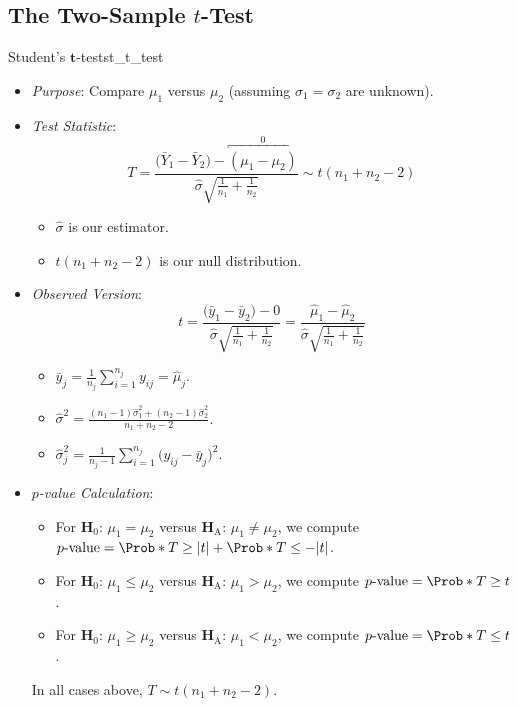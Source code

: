 \subsection{The Two-Sample \texorpdfstring{$ t $}{t}-Test}
\begin{Statistical_Test}{Student's $ \symbf{t} $-test}{st_t_test}
    \begin{itemize}
        \item \emph{Purpose}: Compare $ \mu_1 $ versus $ \mu_2 $ (assuming $ \sigma_1=\sigma_2 $ are unknown).
        \item \emph{Test Statistic}:
              \[ T=\frac{\bigl(\bar{Y}_1-\bar{Y}_2\bigr)-\overbracket{(\mu_1-\mu_2)}^0}{\displaystyle \hat{\sigma}\sqrt{\frac{1}{n_1}+\frac{1}{n_2}}}\sim t(n_1+n_2-2) \]
              \begin{itemize}
                  \item $ \hat{\sigma} $ is our estimator.
                  \item $ t(n_1+n_2-2) $ is our null distribution.
              \end{itemize}
        \item \emph{Observed Version}:
              \[ t=\frac{\bigl(\bar{y}_1-\bar{y}_2\bigr)-0}{\displaystyle \hat{\sigma}\sqrt{\frac{1}{n_1}+\frac{1}{n_2}}}
                  =\frac{\hat{\mu}_1-\hat{\mu}_2}{\displaystyle \hat{\sigma}\sqrt{\frac{1}{n_1}+\frac{1}{n_2}}} \]
              \begin{itemize}
                  \item $ \displaystyle \bar{y}_j= \frac{1}{n_j}\sum_{i=1}^{n_j} y_{ij}=\hat{\mu}_j $.
                  \item $ \displaystyle \hat{\sigma}^2=\frac{(n_1-1)\hat{\sigma}_1^2+(n_2-1)\hat{\sigma}_2^2}{n_1+n_2-2} $.
                  \item $ \displaystyle \hat{\sigma}_j^2=\frac{1}{n_j-1} \sum_{i=1}^{n_j} \bigl(y_{ij}-\bar{y}_j\bigr)^2 $.
              \end{itemize}
        \item \emph{$ p $-value Calculation}:
              \begin{itemize}
                  \item For $ \mathbf{H}_0 $: $ \mu_1=\mu_2 $ versus $ \mathbf{H}_\text{A} $: $ \mu_1\ne\mu_2 $, we compute
                        $ p\text{-value}=\Prob*{T\ge \abs{t}}+\Prob*{T\le -\abs{t}} $.
                  \item For $ \mathbf{H}_0 $: $ \mu_1\le\mu_2 $ versus $ \mathbf{H}_\text{A} $: $ \mu_1>\mu_2 $, we compute
                        $ p\text{-value}=\Prob*{T\ge t} $.
                  \item For $ \mathbf{H}_0 $: $ \mu_1\ge\mu_2 $ versus $ \mathbf{H}_\text{A} $: $ \mu_1<\mu_2 $, we compute
                        $ p\text{-value}=\Prob*{T\le t} $.
              \end{itemize}
              \begin{Remark}{}{}
                  In all cases above, $ T \sim t(n_1+n_2-2) $.
              \end{Remark}
    \end{itemize}
\end{Statistical_Test}
